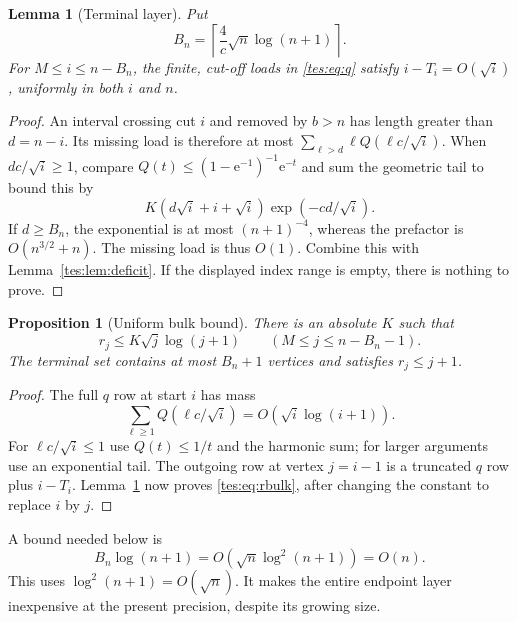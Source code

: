 \documentclass[11pt,a4paper]{article}
\newtheorem{lemma}[theorem]{Lemma}
\newtheorem{proposition}[theorem]{Proposition}
\theoremstyle{remark}\newtheorem{remark}[theorem]{Remark}
\newcommand{\ee}{\mathrm e}\newcommand{\dd}{\,\mathrm d}
\numberwithin{equation}{section}
\begin{document}
\begin{lemma}[Terminal layer]\label{tes:lem:terminal}
Put
\begin{equation}\label{tes:eq:B}
B_n=\left\lceil\frac4c\sqrt n\log(n+1)\right\rceil.
\end{equation}
For $M\le i\le n-B_n$, the finite, cut-off loads in \eqref{tes:eq:q} satisfy
$i-T_i=O(\sqrt i)$, uniformly in both $i$ and $n$.
\end{lemma}
\begin{proof}
An interval crossing cut $i$ and removed by $b>n$ has length greater than $d=n-i$. Its missing load is therefore at most
$\sum_{\ell>d}\ell Q(\ell c/\sqrt i)$.
When $dc/\sqrt i\ge1$, compare $Q(t)\le(1-\ee^{-1})^{-1}\ee^{-t}$ and sum the geometric tail to bound this by
\begin{equation}\label{tes:eq:terminalmass}
K(d\sqrt i+i+\sqrt i)\exp(-cd/\sqrt i).
\end{equation}
If $d\ge B_n$, the exponential is at most $(n+1)^{-4}$, whereas the prefactor is $O(n^{3/2}+n)$. The missing load is thus $O(1)$. Combine this with Lemma~\ref{tes:lem:deficit}. If the displayed index range is empty, there is nothing to prove.
\end{proof}

\begin{proposition}[Uniform bulk bound]\label{tes:prop:bulk}
There is an absolute $K$ such that
\begin{equation}\label{tes:eq:rbulk}
r_j\le K\sqrt j\log(j+1)\qquad(M\le j\le n-B_n-1).
\end{equation}
The terminal set contains at most $B_n+1$ vertices and satisfies $r_j\le j+1$.
\end{proposition}
\begin{proof}
The full $q$ row at start $i$ has mass
\[
\sum_{\ell\ge1}Q(\ell c/\sqrt i)=O(\sqrt i\log(i+1)).
\]
For $\ell c/\sqrt i\le1$ use $Q(t)\le1/t$ and the harmonic sum; for larger arguments use an exponential tail. The outgoing row at vertex $j=i-1$ is a truncated $q$ row plus $i-T_i$. Lemma~\ref{tes:lem:terminal} now proves \eqref{tes:eq:rbulk}, after changing the constant to replace $i$ by $j$.
\end{proof}

A bound needed below is
\begin{equation}\label{tes:eq:boundarycost}
B_n\log(n+1)=O(\sqrt n\log^2(n+1))=O(n).
\end{equation}
This uses $\log^2(n+1)=O(\sqrt n)$. It makes the entire endpoint layer inexpensive at the present precision, despite its growing size.
\end{document}
